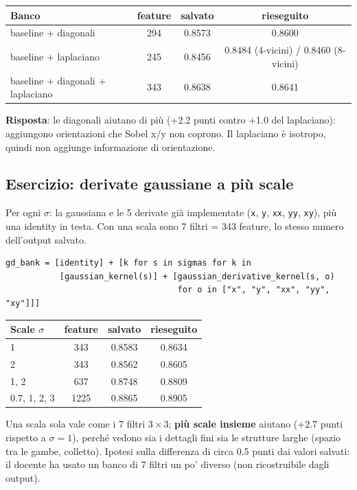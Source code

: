 \documentclass[11pt,a4paper]{article}
\newcommand{\code}[1]{\texttt{#1}}
\begin{document}
\begin{center}
\begin{tabular}{@{}lccc@{}}
\toprule
Banco & feature & salvato & rieseguito \\
\midrule
baseline + diagonali & 294 & 0.8573 & 0.8600 \\
baseline + laplaciano & 245 & 0.8456 & 0.8484 (4-vicini) / 0.8460 (8-vicini) \\
baseline + diagonali + laplaciano & 343 & 0.8638 & 0.8641 \\
\bottomrule
\end{tabular}
\end{center}

\textbf{Risposta}: le diagonali aiutano di più (+2.2 punti contro +1.0 del laplaciano): aggiungono orientazioni che Sobel x/y non coprono. Il laplaciano è isotropo, quindi non aggiunge informazione di orientazione.

\subsection{Esercizio: derivate gaussiane a più scale}

\begin{soluzione}
Per ogni $\sigma$: la gaussiana e le 5 derivate già implementate (\code{x}, \code{y}, \code{xx}, \code{yy}, \code{xy}), più una identity in testa. Con una scala sono 7 filtri = 343 feature, lo stesso numero dell'output salvato.
\begin{Verbatim}
gd_bank = [identity] + [k for s in sigmas for k in
           [gaussian_kernel(s)] + [gaussian_derivative_kernel(s, o)
                                   for o in ["x", "y", "xx", "yy", "xy"]]]
\end{Verbatim}
\end{soluzione}

\begin{center}
\begin{tabular}{@{}lccc@{}}
\toprule
Scale $\sigma$ & feature & salvato & rieseguito \\
\midrule
1 & 343 & 0.8583 & 0.8634 \\
2 & 343 & 0.8562 & 0.8605 \\
1, 2 & 637 & 0.8748 & 0.8809 \\
0.7, 1, 2, 3 & 1225 & 0.8865 & 0.8905 \\
\bottomrule
\end{tabular}
\end{center}

Una scala sola vale come i 7 filtri $3 \times 3$; \textbf{più scale insieme} aiutano (+2.7 punti rispetto a $\sigma = 1$), perché vedono sia i dettagli fini sia le strutture larghe (spazio tra le gambe, colletto). Ipotesi sulla differenza di circa 0.5 punti dai valori salvati: il docente ha usato un banco di 7 filtri un po' diverso (non ricostruibile dagli output).
\end{document}
